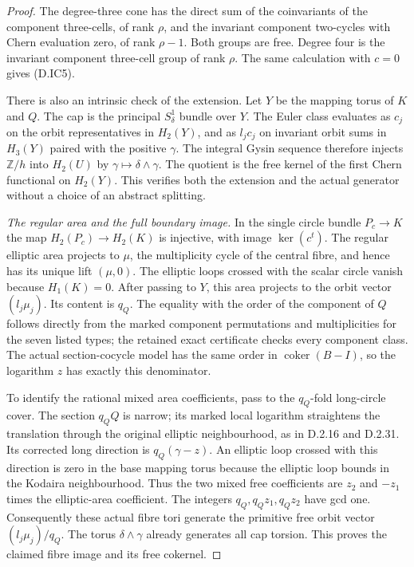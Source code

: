 \begin{proof}
The degree-three cone has the direct sum of the
coinvariants of the component three-cells, of rank
$\rho$, and the invariant component two-cycles with
Chern evaluation zero, of rank $\rho-1$.
Both groups are free. Degree four is the invariant
component three-cell group of rank $\rho$.
The same calculation with $c=0$ gives (D.IC5).

There is also an intrinsic check of the extension.
Let $Y$ be the mapping torus of $K$ and $Q$.
The cap is the principal $S^1_\delta$ bundle over $Y$.
The Euler class evaluates as $c_j$ on the orbit
representatives in $H_2(Y)$, and as $l_jc_j$ on
invariant orbit sums in $H_3(Y)$ paired with the
positive $\gamma$. The integral Gysin sequence
therefore injects $\mathbb Z/h$ into $H_2(U)$ by
$\gamma\mapsto\delta\wedge\gamma$.
The quotient is the free kernel of the first Chern
functional on $H_2(Y)$. This verifies both the
extension and the actual generator without a
choice of an abstract splitting.

\emph{The regular area and the full boundary image.}
In the single circle bundle $P_c\to K$ the map
$H_2(P_c)\to H_2(K)$ is injective, with image
$\ker(c^t)$. The regular elliptic area projects to
$\mu$, the multiplicity cycle of the central fibre,
and hence has its unique lift $(\mu,0)$.
The elliptic loops crossed with the scalar circle
vanish because $H_1(K)=0$.
After passing to $Y$, this area projects to the
orbit vector $(l_j\mu_j)$. Its content is $q_Q$.
The equality with the order of the component of
$Q$ follows directly from the marked component
permutations and multiplicities for the seven listed
types; the retained exact certificate checks every
component class. The actual section-cocycle model
has the same order in $\operatorname{coker}(B-I)$,
so the logarithm $z$ has exactly this denominator.

To identify the rational mixed area coefficients,
pass to the $q_Q$-fold long-circle cover.
The section $q_QQ$ is narrow; its marked local
logarithm straightens the translation through the
original elliptic neighbourhood, as in D.2.16 and
D.2.31. Its corrected long direction is
$q_Q(\gamma-z)$. An elliptic loop crossed with this
direction is zero in the base mapping torus because
the elliptic loop bounds in the Kodaira neighbourhood.
Thus the two mixed free coefficients are $z_2$ and
$-z_1$ times the elliptic-area coefficient.
The integers $q_Q,q_Qz_1,q_Qz_2$ have gcd one.
Consequently these actual fibre tori generate the
primitive free orbit vector
$(l_j\mu_j)/q_Q$.
The torus $\delta\wedge\gamma$ already generates
all cap torsion. This proves the claimed fibre
image and its free cokernel.


\end{proof}
